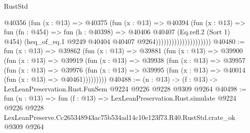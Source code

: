 \begin{lexlean}{RustStd}
\begin{coremodule}
                                    @40356
                                      (fun (x : @13) =>
                                      @40375
                                        (fun (x : @13) =>
                                        @40394
                                          (fun (x : @13) =>
                                          fun (fn : @454) =>
                                          fun (h : @40398) =>
                                          @40406
                                            @40407
                                            (Eq.refl.{2} (Sort 1) @454)
                                            (heq_of_eq.{1}
                                              @9249
                                              @40404
                                              @40407
                                              @9264)))))))))))))))))))))
@40480 := fun (x : @13) =>
  @39862
    (fun (x : @13) =>
    @39881
      (fun (x : @13) =>
      @39900
        (fun (x : @13) =>
        @39919
          (fun (x : @13) =>
          @39938
            (fun (x : @13) =>
            @39957
              (fun (x : @13) =>
              @39976
                (fun (x : @13) => @39995 (fun (x : @13) => @40014 (fun (x : @13) => @40461)))))))))
@40488 := (n : @13) -> (f : @13) -> LexLeanPreservation.Rust.FunSem @9224 @9226 @9228 @9309 @9264
@40498 := fun (n : @13) =>
  fun (f : @13) =>
  LexLeanPreservation.Rust.simulate
    @9224
    @9226
    @9228
    LexLeanPreserve.Cc265348943ac75b534ad14c10e123f73.R40.RustStd.crate_ok
    @9309
    @9264
\end{coremodule}
\end{lexlean}
